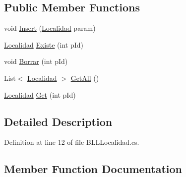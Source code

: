 \subsection*{Public Member Functions}
\begin{DoxyCompactItemize}
\item 
void \hyperlink{classprj_progra_i_i_i_1_1_layer_1_1_business___logic_1_1_b_l_l_localidad_a4c0ae52352d4acd717e66a511e667350}{Insert} (\hyperlink{classprj_progra_i_i_i_1_1_layer_1_1_entities_1_1_localidad}{Localidad} param)
\item 
\hyperlink{classprj_progra_i_i_i_1_1_layer_1_1_entities_1_1_localidad}{Localidad} \hyperlink{classprj_progra_i_i_i_1_1_layer_1_1_business___logic_1_1_b_l_l_localidad_a41a84b4c9b5c80fcbb5a1dd3e2328742}{Existe} (int p\+Id)
\item 
void \hyperlink{classprj_progra_i_i_i_1_1_layer_1_1_business___logic_1_1_b_l_l_localidad_a6f043ce9e0864bd477c37e7d6d228e0e}{Borrar} (int p\+Id)
\item 
List$<$ \hyperlink{classprj_progra_i_i_i_1_1_layer_1_1_entities_1_1_localidad}{Localidad} $>$ \hyperlink{classprj_progra_i_i_i_1_1_layer_1_1_business___logic_1_1_b_l_l_localidad_a0d66ff6caddf671534b300fb5ce2c3df}{Get\+All} ()
\item 
\hyperlink{classprj_progra_i_i_i_1_1_layer_1_1_entities_1_1_localidad}{Localidad} \hyperlink{classprj_progra_i_i_i_1_1_layer_1_1_business___logic_1_1_b_l_l_localidad_a812546114fa49a4ca4ea9295d0d9e62b}{Get} (int p\+Id)
\end{DoxyCompactItemize}


\subsection{Detailed Description}


Definition at line 12 of file B\+L\+L\+Localidad.\+cs.



\subsection{Member Function Documentation}
\hypertarget{classprj_progra_i_i_i_1_1_layer_1_1_business___logic_1_1_b_l_l_localidad_a6f043ce9e0864bd477c37e7d6d228e0e}{}\label{classprj_progra_i_i_i_1_1_layer_1_1_business___logic_1_1_b_l_l_localidad_a6f043ce9e0864bd477c37e7d6d228e0e} 

